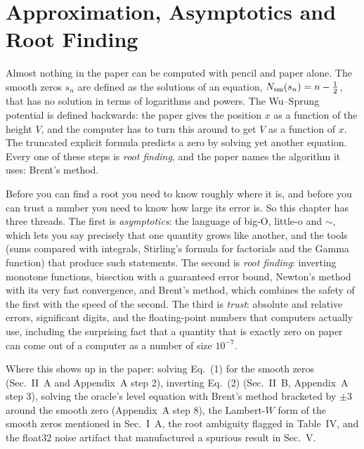 \chapter{Approximation, Asymptotics and Root Finding}\label{ch:asymptotics}

\begin{chapterintro}
Almost nothing in the paper can be computed with pencil and paper alone. The smooth zeros $s_n$ are defined as the solutions of an equation, $N_{\mathrm{sm}}(s_n)=n-\tfrac12$, that has no solution in terms of logarithms and powers. The Wu--Sprung potential is defined backwards: the paper gives the position $x$ as a function of the height $V$, and the computer has to turn this around to get $V$ as a function of $x$. The truncated explicit formula predicts a zero by solving yet another equation. Every one of these steps is \emph{root finding}, and the paper names the algorithm it uses: Brent's method.

Before you can find a root you need to know roughly where it is, and before you can trust a number you need to know how large its error is. So this chapter has three threads. The first is \emph{asymptotics}: the language of big-O, little-o and $\sim$, which lets you say precisely that one quantity grows like another, and the tools (sums compared with integrals, Stirling's formula for factorials and the Gamma function) that produce such statements. The second is \emph{root finding}: inverting monotone functions, bisection with a guaranteed error bound, Newton's method with its very fast convergence, and Brent's method, which combines the safety of the first with the speed of the second. The third is \emph{trust}: absolute and relative errors, significant digits, and the floating-point numbers that computers actually use, including the surprising fact that a quantity that is exactly zero on paper can come out of a computer as a number of size $10^{-7}$.

Where this shows up in the paper: solving Eq.~(1) for the smooth zeros (Sec.~II~A and Appendix~A step 2), inverting Eq.~(2) (Sec.~II~B, Appendix~A step 3), solving the oracle's level equation with Brent's method bracketed by $\pm3$ around the smooth zero (Appendix~A step 8), the Lambert-$W$ form of the smooth zeros mentioned in Sec.~I~A, the root ambiguity flagged in Table~IV, and the float32 noise artifact that manufactured a spurious result in Sec.~V.
\end{chapterintro}

